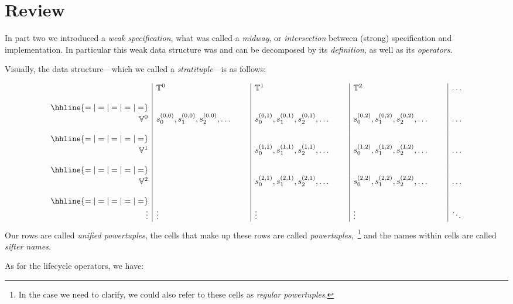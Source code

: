 \documentclass[twoside]{article}
\newcommand{\nthpt}[2][T]{\ensuremath{\mathbb{#1}^{#2}}}
\newcommand{\nthut}[2][V]{\ensuremath{\mathbb{#1}^{#2}}}
\newcommand{\sifter}[3]{\ensuremath{s^{(#1, #2)}_{#3}}}
\begin{document}
\section*{Review}

In part two we introduced a \emph{weak specification}, what was called a \emph{midway}, or \emph{intersection}
between (strong) specification and implementation. In particular this weak data structure was and can be
decomposed by its \emph{definition}, as well as its \emph{operators}.

Visually, the data structure---which we called a \emph{stratituple}---is as follows:

$$ \begin{array}{r|l|l|l|l}
									&
\nthpt{0}								&
\nthpt{1}								&
\nthpt{2}								& \ldots \\
									& & & & \\
\hhline{=|=|=|=|=}
									& & & & \\
\nthut{0}								&
\sifter{0}{0}{0}, \sifter{0}{0}{1}, \sifter{0}{0}{2}, \ldots\qquad	&
\sifter{0}{1}{0}, \sifter{0}{1}{1}, \sifter{0}{1}{2}, \ldots\qquad	&
\sifter{0}{2}{0}, \sifter{0}{2}{1}, \sifter{0}{2}{2}, \ldots\qquad	& \ldots \\
									& & & & \\
\hhline{=|=|=|=|=}
									& & & & \\
\nthut{1}								&
									&
\sifter{1}{1}{0}, \sifter{1}{1}{1}, \sifter{1}{1}{2}, \ldots\qquad	&
\sifter{1}{2}{0}, \sifter{1}{2}{1}, \sifter{1}{2}{2}, \ldots\qquad	& \ldots \\
									& & & & \\
\hhline{=|=|=|=|=}
									& & & & \\
\nthut{2}								&
									&
\sifter{2}{1}{0}, \sifter{2}{1}{1}, \sifter{2}{1}{2}, \ldots\qquad	&
\sifter{2}{2}{0}, \sifter{2}{2}{1}, \sifter{2}{2}{2}, \ldots\qquad	& \ldots \\
									& & & & \\
\hhline{=|=|=|=|=}
									& & & & \\
\vdots	& \vdots & \vdots & \vdots & \ddots
\end{array} $$
Our rows are called \emph{unified powertuples}, the cells that make up these rows are called
\emph{powertuples},~\footnote{In the case we need to clarify, we could also refer to these cells
as \emph{regular powertuples}.} and the names within cells are called \emph{sifter names}.

As for the lifecycle operators, we have:
\end{document}
